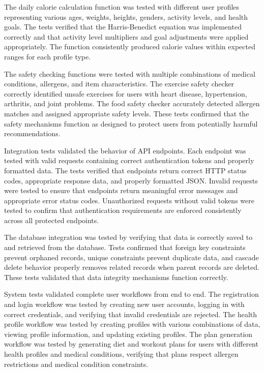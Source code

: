 The daily calorie calculation function was tested with different user profiles representing various ages, weights, heights, genders, activity levels, and health goals. The tests verified that the Harris-Benedict equation was implemented correctly and that activity level multipliers and goal adjustments were applied appropriately. The function consistently produced calorie values within expected ranges for each profile type.

The safety checking functions were tested with multiple combinations of medical conditions, allergens, and item characteristics. The exercise safety checker correctly identified unsafe exercises for users with heart disease, hypertension, arthritis, and joint problems. The food safety checker accurately detected allergen matches and assigned appropriate safety levels. These tests confirmed that the safety mechanisms function as designed to protect users from potentially harmful recommendations.

Integration tests validated the behavior of API endpoints. Each endpoint was tested with valid requests containing correct authentication tokens and properly formatted data. The tests verified that endpoints return correct HTTP status codes, appropriate response data, and properly formatted JSON. Invalid requests were tested to ensure that endpoints return meaningful error messages and appropriate error status codes. Unauthorized requests without valid tokens were tested to confirm that authentication requirements are enforced consistently across all protected endpoints.

The database integration was tested by verifying that data is correctly saved to and retrieved from the database. Tests confirmed that foreign key constraints prevent orphaned records, unique constraints prevent duplicate data, and cascade delete behavior properly removes related records when parent records are deleted. These tests validated that data integrity mechanisms function correctly.

System tests validated complete user workflows from end to end. The registration and login workflow was tested by creating new user accounts, logging in with correct credentials, and verifying that invalid credentials are rejected. The health profile workflow was tested by creating profiles with various combinations of data, viewing profile information, and updating existing profiles. The plan generation workflow was tested by generating diet and workout plans for users with different health profiles and medical conditions, verifying that plans respect allergen restrictions and medical condition constraints.

